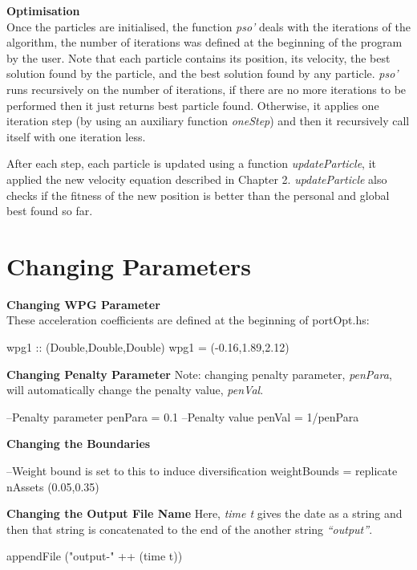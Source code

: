   \textbf{Optimisation} \\
  Once the particles are initialised, the function \textit{pso'} deals with the iterations of the algorithm, the number of iterations was defined at the beginning of the program by the user. Note that each particle contains its position, its velocity, the best solution found by the particle, and the best solution found by any particle. \textit{pso'} runs recursively on the number of iterations, if there are no more iterations to be performed then it just returns best particle found. Otherwise, it applies one iteration step (by using an auxiliary function \textit{oneStep}) and then it recursively call itself with one iteration less.

  After each step, each particle is updated using a function \textit{updateParticle}, it applied the new velocity equation described in Chapter 2. \textit{updateParticle} also checks if the fitness of the new position is better than the personal and global best found so far. 


\section*{Changing Parameters}
  \textbf{Changing WPG Parameter}\\
  These acceleration coefficients are defined at the beginning of portOpt.hs:
  \begin{code}
    wpg1 :: (Double,Double,Double)
    wpg1 = (-0.16,1.89,2.12)
  \end{code}
  \textbf{Changing Penalty Parameter} Note: changing penalty parameter, \textit{penPara}, will automatically change the penalty value, \textit{penVal}.
  \begin{code}
    --Penalty parameter
    penPara = 0.1
    --Penalty value
    penVal = 1/penPara
  \end{code}
  \textbf{Changing the Boundaries}
  \begin{code}
    --Weight bound is set to this to induce diversification
    weightBounds = replicate nAssets (0.05,0.35)
  \end{code}
  \textbf{Changing the Output File Name} Here, \textit{time t} gives the date as a string and then that string is concatenated to the end of the another string \textit{``output''}.
  \begin{code}
    appendFile ("output-" ++ (time t))
  \end{code}



